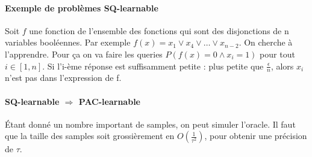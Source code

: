 \documentclass{article}		%
\theoremstyle{definition}
\theoremstyle{plain}
\theoremstyle{plain}
\theoremstyle{plain}
\theoremstyle{plain}
\theoremstyle{plain}
\begin{document}
\paragraph{Exemple de problèmes SQ-learnable}
Soit $f$ une fonction de l'ensemble des fonctions qui sont des
disjonctions de n variables booléennes. Par exemple
$f(x)=x_1 \vee x_4 \vee \dots \vee x_{n-2}$.
On cherche à l'apprendre. Pour ça on va faire les queries
$P(f(x)=0\wedge x_i=1)$ pour tout $i\in [1,n]$. Si l'i-ème réponse est
suffisamment petite : plus petite que $\frac{\epsilon}{n}$, alors $x_i$
n'est pas dans l'expression de f.  
\paragraph{SQ-learnable $\Rightarrow$ PAC-learnable}
Étant donné un nombre important de samples, on peut simuler l'oracle. Il
faut que la taille des samples soit grossièrement en
$O(\frac{1}{\tau^2})$, pour obtenir une précision de $\tau$.
  
\end{document}
